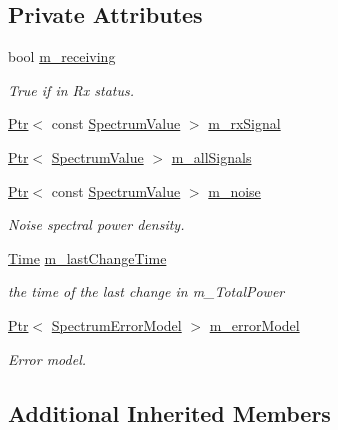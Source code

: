 \subsection*{Private Attributes}
\begin{DoxyCompactItemize}
\item 
bool \hyperlink{classns3_1_1SpectrumInterference_a5a10048a40d64f8502c8eecc7110bb13}{m\+\_\+receiving}
\begin{DoxyCompactList}\small\item\em True if in Rx status. \end{DoxyCompactList}\item 
\hyperlink{classns3_1_1Ptr}{Ptr}$<$ const \hyperlink{classns3_1_1SpectrumValue}{Spectrum\+Value} $>$ \hyperlink{classns3_1_1SpectrumInterference_aff6a566f35e280048bb970e5975b117e}{m\+\_\+rx\+Signal}
\item 
\hyperlink{classns3_1_1Ptr}{Ptr}$<$ \hyperlink{classns3_1_1SpectrumValue}{Spectrum\+Value} $>$ \hyperlink{classns3_1_1SpectrumInterference_a3752d3d120a5f1e8d82a024c25b4717c}{m\+\_\+all\+Signals}
\item 
\hyperlink{classns3_1_1Ptr}{Ptr}$<$ const \hyperlink{classns3_1_1SpectrumValue}{Spectrum\+Value} $>$ \hyperlink{classns3_1_1SpectrumInterference_a60dbe61438ba4d4b5eb2a5aa2a8f150a}{m\+\_\+noise}
\begin{DoxyCompactList}\small\item\em Noise spectral power density. \end{DoxyCompactList}\item 
\hyperlink{classns3_1_1Time}{Time} \hyperlink{classns3_1_1SpectrumInterference_a52aa2869af2d44ceb05533ad0c27f83f}{m\+\_\+last\+Change\+Time}
\begin{DoxyCompactList}\small\item\em the time of the last change in m\+\_\+\+Total\+Power \end{DoxyCompactList}\item 
\hyperlink{classns3_1_1Ptr}{Ptr}$<$ \hyperlink{classns3_1_1SpectrumErrorModel}{Spectrum\+Error\+Model} $>$ \hyperlink{classns3_1_1SpectrumInterference_aa45df49807474e21eeed9613857a3f9f}{m\+\_\+error\+Model}
\begin{DoxyCompactList}\small\item\em Error model. \end{DoxyCompactList}\end{DoxyCompactItemize}
\subsection*{Additional Inherited Members}


